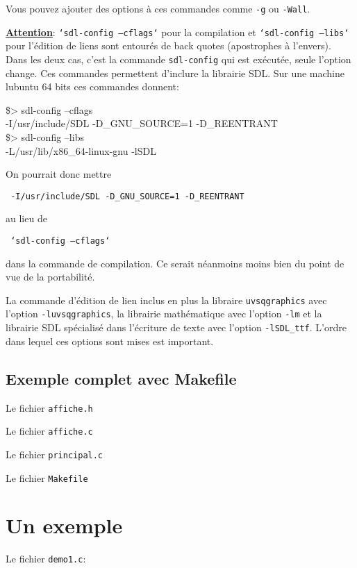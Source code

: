 \documentclass{report}
\newcommand\code[1]{
\begin{mdframed}[linecolor=purple,backgroundcolor=blue!10]
{\tt
#1
}
\end{mdframed}
}
\begin{document}
Vous pouvez ajouter des options à ces commandes comme \texttt{-g} ou \texttt{-Wall}.

\vspace{5mm}
\noindent
\underline{\bf Attention}: \texttt{`sdl-config --cflags`} pour la compilation et \texttt{`sdl-config --libs`} pour l'édition de liens sont entourés de back quotes (apostrophes à l'envers).
Dans les deux cas, c'est la commande \texttt{sdl-config} qui est exécutée, seule l'option change. Ces commandes permettent d'inclure la librairie SDL.
Sur une machine lubuntu 64 bits ces commandes donnent:
\code{
\$> sdl-config --cflags\\
-I/usr/include/SDL -D\_GNU\_SOURCE=1 -D\_REENTRANT\\
\$> sdl-config --libs\\
-L/usr/lib/x86\_64-linux-gnu -lSDL
}
On pourrait donc mettre
\code{-I/usr/include/SDL -D\_GNU\_SOURCE=1 -D\_REENTRANT}
au lieu de
\code{`sdl-config --cflags`}
dans la commande de compilation. Ce serait néanmoins moins bien du point de vue de la portabilité.

\vspace{5mm}
La commande d'édition de lien inclus en plus la libraire \texttt{uvsqgraphics} avec l'option \texttt{-luvsqgraphics}, 
la librairie mathématique avec l'option \texttt{-lm} et la librairie SDL spécialisé dans l'écriture de texte avec l'option 
\texttt{-lSDL\_ttf}. L'ordre dans lequel ces options sont mises est important.


\section{Exemple complet avec Makefile}
Le fichier \texttt{affiche.h} \code{  }

Le fichier \texttt{affiche.c} \code{  }

Le fichier \texttt{principal.c} \code{  }

Le fichier \texttt{Makefile} \code{  }

\chapter{Un exemple\label{chap:exemple}}
Le fichier \texttt{demo1.c}:
\code{

}

\newcommand\letac[2]{\#define #1 "\textbackslash #2"\\}
\newcommand\letacfin[2]{\#define #1 "\textbackslash #2"}
\end{document}
